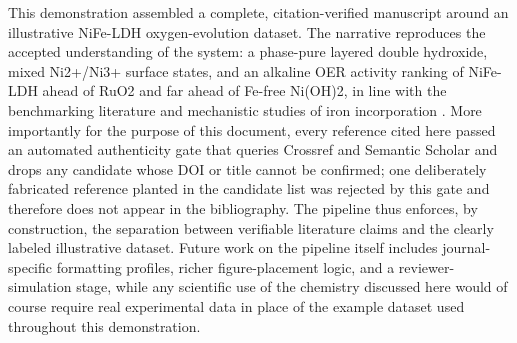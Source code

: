 \documentclass[11pt,a4paper]{article}
\begin{document}
This demonstration assembled a complete, citation-verified manuscript around an illustrative NiFe-LDH oxygen-evolution dataset. The narrative reproduces the accepted understanding of the system: a phase-pure layered double hydroxide, mixed Ni2+/Ni3+ surface states, and an alkaline OER activity ranking of NiFe-LDH ahead of RuO2 and far ahead of Fe-free Ni(OH)2, in line with the benchmarking literature and mechanistic studies of iron incorporation \citep{mccrory2013,trotochaud2014,dionigi2016}. More importantly for the purpose of this document, every reference cited here passed an automated authenticity gate that queries Crossref and Semantic Scholar and drops any candidate whose DOI or title cannot be confirmed; one deliberately fabricated reference planted in the candidate list was rejected by this gate and therefore does not appear in the bibliography. The pipeline thus enforces, by construction, the separation between verifiable literature claims and the clearly labeled illustrative dataset. Future work on the pipeline itself includes journal-specific formatting profiles, richer figure-placement logic, and a reviewer-simulation stage, while any scientific use of the chemistry discussed here would of course require real experimental data in place of the example dataset used throughout this demonstration.




\end{document}
